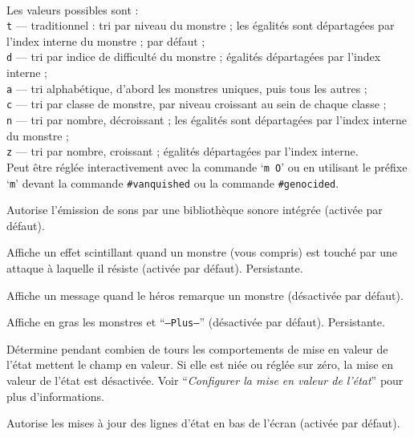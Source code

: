 \documentclass[titlepage]{article}
\begin{document}
\begin{description}[font=\mdseries\itshape]
\\
Les valeurs possibles sont :
\\
\texttt{t} ---
traditionnel : tri par niveau du monstre ; les égalités sont départagées par l'index
interne du monstre ;
par défaut ;
\\
\texttt{d} ---
tri par indice de difficulté du monstre ; égalités départagées par l'index interne ;
\\
\texttt{a} ---
tri alphabétique, d'abord les monstres uniques, puis tous les autres ;
\\
\texttt{c} ---
tri par classe de monstre, par niveau croissant au sein de chaque classe ;
\\
\texttt{n} ---
tri par nombre, décroissant ; les égalités sont départagées par l'index interne du monstre ;
\\
\texttt{z} ---
tri par nombre, croissant ; égalités départagées par l'index interne.
\\
Peut être réglée interactivement avec la commande `\texttt{m O}' ou en utilisant
le préfixe `\texttt{m}' devant la commande \texttt{\#vanquished}
ou la commande \texttt{\#genocided}.
\item[sounds]
Autorise l'émission de sons par une bibliothèque sonore intégrée (activée par défaut).
\item[sparkle]
Affiche un effet scintillant quand un monstre (vous compris) est touché par une
attaque à laquelle il résiste (activée par défaut). Persistante.
\item[spot\textunderscore monsters]
Affiche un message quand le héros remarque un monstre (désactivée par défaut).
\item[standout]
Affiche en gras les monstres et ``\texttt{--Plus--}'' (désactivée par défaut). Persistante.
\item[statushilites]
Détermine pendant combien de tours les comportements de mise en valeur de l'état mettent
le champ en valeur. Si elle est niée ou réglée sur zéro, la mise en valeur de l'état est désactivée.
Voir ``\textit{Configurer la mise en valeur de l'état}'' pour plus d'informations.
\item[status\textunderscore updates]
Autorise les mises à jour des lignes d'état en bas de l'écran (activée par défaut).

\end{description}
\end{document}
